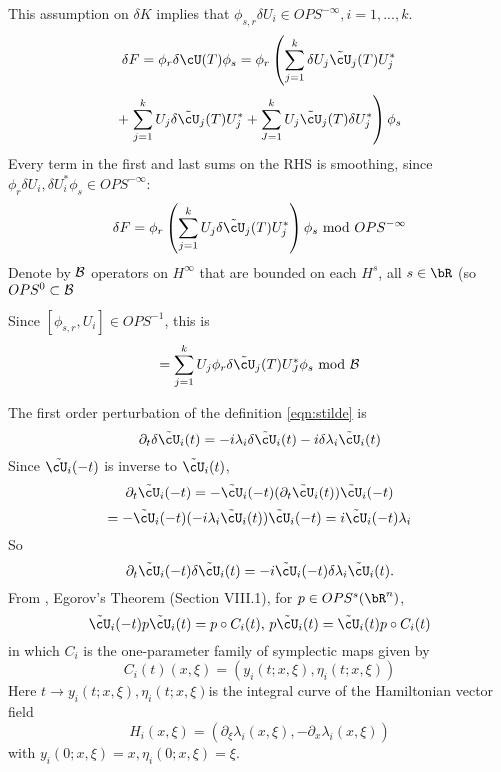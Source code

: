 This assumption on $\delta K$ implies that $\phi_{s,r} \delta U_i \in
OPS^{-\infty}, i=1,...,k$. 
\[
  \delta F =  \phi_r \delta \cU(T) \phi_s  = \phi_r \left(\sum _{j=1}^k \delta U_j \tilde{\cU}_j(T) U_j^*
\right.
\]
\[
 +  \left. \sum_{j=1}^k U_j \delta\tilde{\cU}_j(T)U_j^* + \sum_{J=1}^k U_j
    \tilde{\cU}_j(T)\delta U_j^*\right) \phi_s
\]
Every term in the first and last sums on the RHS is smoothing, since
$\phi_r \delta U_i, \delta U_i^* \phi_s\in OPS^{-\infty}$:
\[
  \delta F = \phi_r \left(\sum_{j=1}^k U_j
    \delta\tilde{\cU}_j(T)U_j^*\right)\phi_s \mbox{ mod }OPS^{-\infty}
\]
Denote by ${\cal B}$ operators on $H^{\infty}$ that are bounded on
each $H^s$, all $s \in \bR$ (so $OPS^0 \subset {\cal B}$

Since $[\phi_{s,r},U_i] \in OPS^{-1}$, this is
\[
  = \sum_{j=1}^k U_j \phi_r \delta \tilde{\cU}_j(T) U_J^*\phi_s 
  \mbox{ mod }{\cal B}
\]

The first order perturbation of the definition \ref{eqn:stilde} is
\begin{equation}
  \label{eqn:dstilde}
  \partial_t \delta \tilde{\cU}_i(t) = - i\lambda_i \delta
  \tilde{\cU}_i(t) - i\delta \lambda_i \tilde{\cU}_i(t)
\end{equation}
Since $\tilde{\cU_i}(-t)$ is inverse to $\tilde{\cU}_i(t)$,
\[
  \partial_t \tilde{\cU}_i(-t)= -\tilde{\cU}_i(-t) (\partial_t \tilde{\cU}_i(t)) \tilde{\cU}_i(-t)
\]
\begin{equation}
  \label{eqn:stildeinv}
= -\tilde{\cU}_i(-t)(-i\lambda_i \tilde{\cU}_i(t)) \tilde{\cU}_i(-t) = i\tilde{\cU}_i(-t)\lambda_i 
\end{equation}
So
\begin{equation}
  \label{eqn:dstildeconj}
  \partial_t\tilde{\cU}_i(-t)\delta \tilde{\cU}_i(t) = -i\tilde{\cU}_i(-t)\delta \lambda_i \tilde{\cU}_i(t).
\end{equation}
From \cite{Tay:81}, Egorov's Theorem (Section VIII.1), for $p \in OPS^s(\bR^n)$,
\begin{equation}
  \label{eqn:egorov}
   \tilde{\cU}_i(-t) p \tilde{\cU}_i(t)=  p \circ C_i(t),\, p\tilde{\cU}_i(t) =
   \tilde{\cU}_i(t)p \circ C_i(t)
\end{equation}
in which $C_i$ is the one-parameter family of symplectic maps given by
\begin{equation}
  \label{eqn:canon}
  C_i(t)(x,\xi)=(y_i(t;x,\xi),\eta_i(t;x,\xi))
\end{equation}
Here $t \rightarrow y_i(t;x,\xi),\eta_i(t;x,\xi) $is the integral curve of the
Hamiltonian vector field
\[
  H_i(x,\xi) = (\partial_{\xi}\lambda_i(x,\xi), - \partial_x\lambda_i(x,\xi)) 
\]
with $y_i(0;x,\xi)=x, \eta_i(0;x,\xi)=\xi$.

